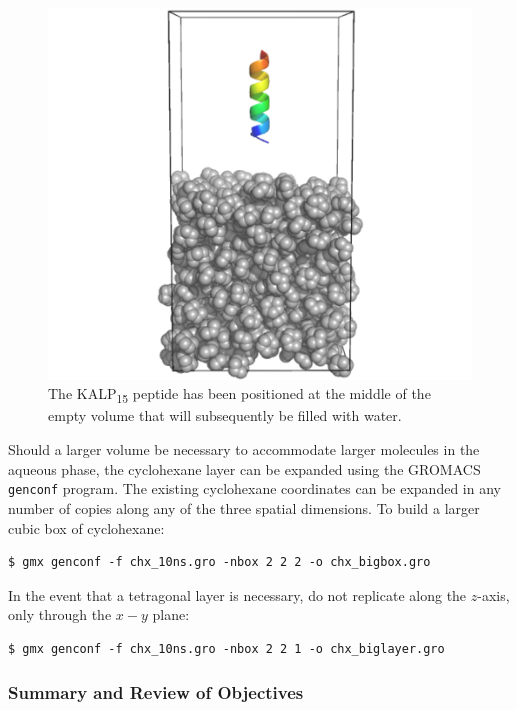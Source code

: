 \documentclass[9pt,tutorial,pubversion]{livecoms}
\begin{document}
\begin{figure}[h!]
\centering
\includegraphics{peptide_chx}
\caption{The KALP\textsubscript{15} peptide has been positioned at the middle of the empty volume that will subsequently be filled with water.}
\label{peptide_chx_fig}
\end{figure}

Should a larger volume be necessary to accommodate larger molecules in the aqueous phase, the cyclohexane layer can be expanded using the GROMACS \texttt{genconf} program. The existing cyclohexane coordinates can be expanded in any number of copies along any of the three spatial dimensions. To build a larger cubic box of cyclohexane:

\begin{lstlisting}
$ gmx genconf -f chx_10ns.gro -nbox 2 2 2 -o chx_bigbox.gro
\end{lstlisting}

In the event that a tetragonal layer is necessary, do not replicate along the $z$-axis, only through the $x-y$ plane:

\begin{lstlisting}
$ gmx genconf -f chx_10ns.gro -nbox 2 2 1 -o chx_biglayer.gro
\end{lstlisting}

\subsubsection{Summary and Review of Objectives} \label{biphasic_summary}
\end{document}
